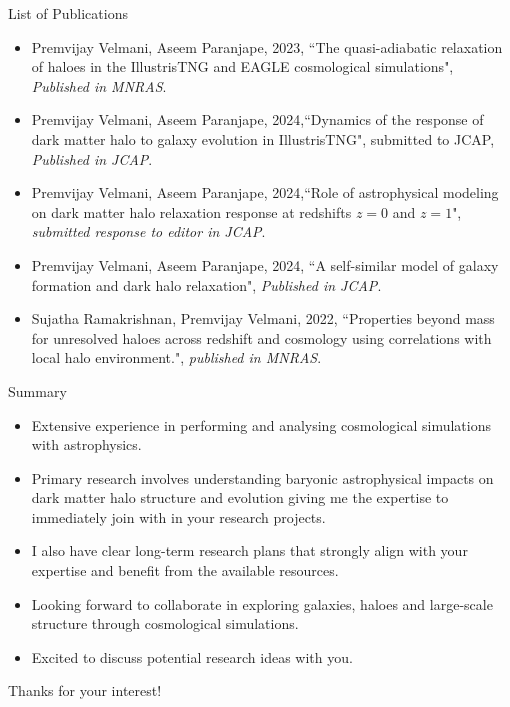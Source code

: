 \documentclass{beamer}
\begin{document}
\begin{frame}{List of Publications}
\begin{itemize}
    \item Premvijay Velmani, Aseem Paranjape, 2023, ``The quasi-adiabatic relaxation of haloes in the IllustrisTNG and EAGLE cosmological simulations", \textit{Published in MNRAS}.
    \item Premvijay Velmani, Aseem Paranjape, 2024,``Dynamics of the response of dark matter halo to galaxy evolution in IllustrisTNG", submitted to JCAP, \textit{Published in JCAP}.
    \item Premvijay Velmani, Aseem Paranjape, 2024,``Role of astrophysical modeling on dark matter halo relaxation response at redshifts $z = 0$ and $z = 1$", \textit{submitted response to editor in JCAP}.
    \item Premvijay Velmani, Aseem Paranjape, 2024, ``A self-similar model of galaxy formation and dark halo relaxation", \textit{Published in JCAP}.
    \item Sujatha Ramakrishnan, Premvijay Velmani, 2022, ``Properties beyond mass for unresolved haloes across redshift and cosmology using correlations with local halo environment.", \textit{published in MNRAS}.
\end{itemize}
\end{frame}

\begin{frame}{Summary}
    \begin{itemize}
        \item Extensive experience in performing and analysing cosmological simulations with astrophysics.
        \item Primary research involves understanding baryonic astrophysical impacts on dark matter halo structure and evolution giving me the expertise to immediately join with in your research projects.
        \item I also have clear long-term research plans that strongly align with your expertise and benefit from the available resources.
        \item Looking forward to collaborate in exploring galaxies, haloes and large-scale structure through cosmological simulations.
        \item Excited to discuss potential research ideas with you.
    \end{itemize}
    \begin{center}
        Thanks for your interest!
    \end{center}
\end{frame}




        

\end{document}
